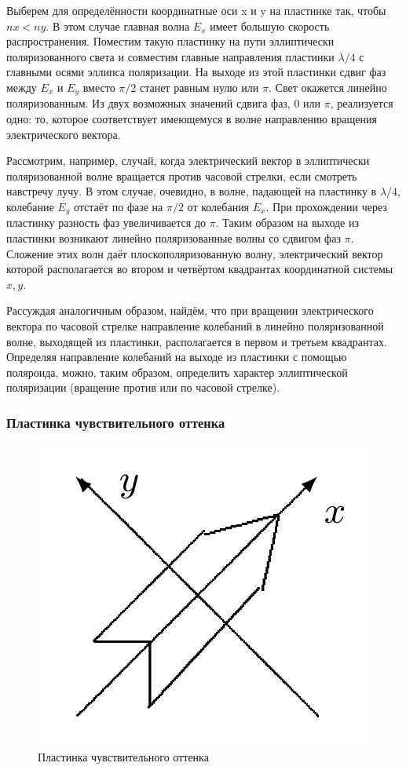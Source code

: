 Выберем для определённости координатные оси x и y на пластинке так, чтобы $ nx < ny $. В этом случае главная волна $ E_x $ имеет большую скорость распространения. Поместим такую пластинку на пути эллиптически поляризованного света и совместим главные направления пластинки $ \lambda/4 $ с главными осями эллипса поляризации. На выходе из этой пластинки сдвиг фаз между $ E_x $ и $ E_y $ вместо $ \pi/2 $ станет равным нулю или $ \pi $. Свет окажется линейно поляризованным. Из двух возможных значений сдвига фаз, 0 или $ \pi $, реализуется одно: то, которое соответствует имеющемуся в волне направлению вращения электрического вектора.

Рассмотрим, например, случай, когда электрический вектор в эллиптически поляризованной волне вращается против часовой стрелки, если смотреть навстречу лучу. В этом случае, очевидно, в волне, падающей на пластинку в $ \lambda/4 $, колебание $ E_y $ отстаёт по фазе на $ \pi/2 $ от колебания $ E_x $. При прохождении через пластинку разность фаз увеличивается до $ \pi $. Таким образом на выходе из пластинки возникают линейно поляризованные волны со сдвигом фаз $ \pi $. Сложение этих волн даёт плоскополяризованную волну, электрический вектор которой располагается во втором и четвёртом квадрантах координатной системы $x, y$.

Рассуждая аналогичным образом, найдём, что при вращении электрического вектора по часовой стрелке направление колебаний в линейно поляризованной волне, выходящей из пластинки, располагается в первом и третьем квадрантах. Определяя направление колебаний на выходе из пластинки с помощью поляроида, можно, таким образом, определить характер эллиптической поляризации (вращение против или по часовой стрелке).

\subsubsection{Пластинка чувствительного оттенка}

\begin{figure}[!hb]
	\centering
	\includegraphics[width=0.2\linewidth]{pics/pic_3.png}
	\caption{{Пластинка чувствительного оттенка}}
	\label{pic_3}
\end{figure}

